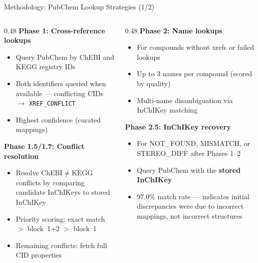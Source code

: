 \documentclass[aspectratio=169,11pt]{beamer}
\begin{document}
\begin{frame}{Methodology: PubChem Lookup Strategies (1/2)}
\small
\begin{columns}[T]
\begin{column}{0.48\textwidth}
\textbf{Phase 1: Cross-reference lookups}
\begin{itemize}\setlength\itemsep{0pt}
  \item Query PubChem by ChEBI and KEGG registry IDs
  \item Both identifiers queried when available ---
        conflicting CIDs $\to$ \texttt{XREF\_CONFLICT}
  \item Highest confidence (curated mappings)
\end{itemize}

\smallskip
\textbf{Phase 1.5/1.7: Conflict resolution}
\begin{itemize}\setlength\itemsep{0pt}
  \item Resolve ChEBI$\neq$KEGG conflicts by comparing
        candidate InChIKeys to stored InChIKey
  \item Priority scoring: exact match $>$ block~1+2 $>$ block~1
  \item Remaining conflicts: fetch full CID properties
\end{itemize}
\end{column}

\begin{column}{0.48\textwidth}
\textbf{Phase 2: Name lookups}
\begin{itemize}\setlength\itemsep{0pt}
  \item For compounds without xrefs or failed lookups
  \item Up to 3 names per compound (scored by quality)
  \item Multi-name disambiguation via InChIKey matching
\end{itemize}

\smallskip
\textbf{Phase 2.5: InChIKey recovery}
\begin{itemize}\setlength\itemsep{0pt}
  \item For NOT\_FOUND, MISMATCH, or STEREO\_DIFF
        after Phases 1--2
  \item Query PubChem with the \textbf{stored InChIKey}
  \item 97.0\% match rate --- indicates initial discrepancies
        were due to incorrect mappings, not incorrect structures
\end{itemize}
\end{column}
\end{columns}

\end{frame}
\end{document}
